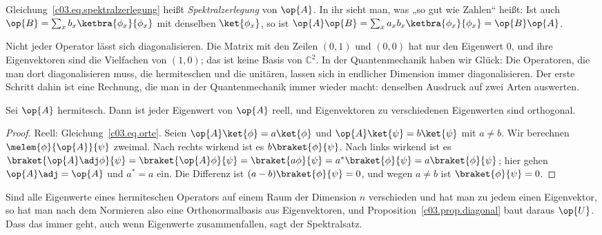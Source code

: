 Gleichung~\eqref{c03.eq.spektralzerlegung} heißt \emph{Spektralzerlegung} von $\op{A}$. In ihr
sieht man, was „so gut wie Zahlen“ heißt: Ist auch
$\op{B} = \sum_x b_x \ketbra{\phi_x}{\phi_x}$ mit denselben $\ket{\phi_x}$, so ist
$\op{A}\op{B} = \sum_x a_x b_x \ketbra{\phi_x}{\phi_x} = \op{B}\op{A}$.

Nicht jeder Operator lässt sich diagonalisieren. Die Matrix mit den Zeilen $(0, 1)$ und $(0, 0)$
hat nur den Eigenwert $0$, und ihre Eigenvektoren sind die Vielfachen von $(1, 0)$; das ist keine
Basis von $\mathbb{C}^2$. In der Quantenmechanik haben wir Glück: Die Operatoren, die man dort
diagonalisieren muss, die hermiteschen und die unitären, lassen sich in endlicher Dimension immer
diagonalisieren. Der erste Schritt dahin ist eine Rechnung, die man in der Quantenmechanik immer
wieder macht: denselben Ausdruck auf zwei Arten auswerten.

\begin{proposition}\label{c03.prop.eigen-hermitesch}
  Sei $\op{A}$ hermitesch. Dann ist jeder Eigenwert von $\op{A}$ reell, und Eigenvektoren zu
  verschiedenen Eigenwerten sind orthogonal.
\end{proposition}
\begin{proof}
  Reell: Gleichung~\eqref{c03.eq.orte}. Seien $\op{A}\ket{\phi} = a\ket{\phi}$ und
  $\op{A}\ket{\psi} = b\ket{\psi}$ mit $a \neq b$. Wir berechnen $\melem{\phi}{\op{A}}{\psi}$
  zweimal. Nach rechts wirkend ist es $b\braket{\phi}{\psi}$. Nach links wirkend ist es
  $\braket{\op{A}\adj\phi}{\psi} = \braket{\op{A}\phi}{\psi} = \braket{a\phi}{\psi} = a^*\braket{\phi}{\psi} = a\braket{\phi}{\psi}$;
  hier gehen $\op{A}\adj = \op{A}$ und $a^* = a$ ein. Die Differenz ist
  $(a - b)\braket{\phi}{\psi} = 0$, und wegen $a \neq b$ ist $\braket{\phi}{\psi} = 0$.
\end{proof}

Sind alle Eigenwerte eines hermiteschen Operators auf einem Raum der Dimension $n$ verschieden
und hat man zu jedem einen Eigenvektor, so hat man nach dem Normieren also eine Orthonormalbasis
aus Eigenvektoren, und Proposition~\ref{c03.prop.diagonal} baut daraus $\op{U}$. Dass das immer
geht, auch wenn Eigenwerte zusammenfallen, sagt der Spektralsatz.

